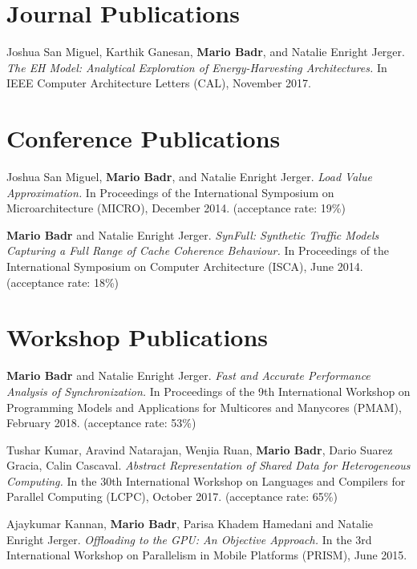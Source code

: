 \section{\sc Journal Publications}

\onerow
{
  Joshua San Miguel, Karthik Ganesan, \textbf{Mario Badr}, and Natalie Enright Jerger.
  \textit{The EH Model: Analytical Exploration of Energy-Harvesting Architectures.}
  In IEEE Computer Architecture Letters (CAL), November 2017.
}

\section{\sc Conference Publications}

\onerow
{
  Joshua San Miguel, \textbf{Mario Badr}, and Natalie Enright Jerger.
  \textit{Load Value Approximation.}
  In Proceedings of the International Symposium on Microarchitecture (MICRO), December 2014.
  (acceptance rate: 19\%)
}

\onerow
{
  \textbf{Mario Badr} and Natalie Enright Jerger.
  \textit{SynFull: Synthetic Traffic Models Capturing a Full Range of Cache Coherence Behaviour.}
  In Proceedings of the International Symposium on Computer Architecture (ISCA), June 2014.
  (acceptance rate: 18\%)
}

\section{\sc Workshop Publications}

\onerow
{
  \textbf{Mario Badr} and Natalie Enright Jerger.
  \textit{Fast and Accurate Performance Analysis of Synchronization.}
  In Proceedings of the 9th International Workshop on Programming Models and Applications for Multicores and Manycores (PMAM), February 2018.
  (acceptance rate: 53\%)
}

\onerow
{
  Tushar Kumar, Aravind Natarajan, Wenjia Ruan, \textbf{Mario Badr}, Dario Suarez Gracia, Calin Cascaval.
  \textit{Abstract Representation of Shared Data for Heterogeneous Computing.}
  In the 30th International Workshop on Languages and Compilers for Parallel Computing (LCPC), October 2017.
  (acceptance rate: 65\%)
}

\onerow
{
  Ajaykumar Kannan, \textbf{Mario Badr}, Parisa Khadem Hamedani and Natalie Enright Jerger.
  \textit{Offloading to the GPU: An Objective Approach.}
  In the 3rd International Workshop on Parallelism in Mobile Platforms (PRISM), June 2015.
}

